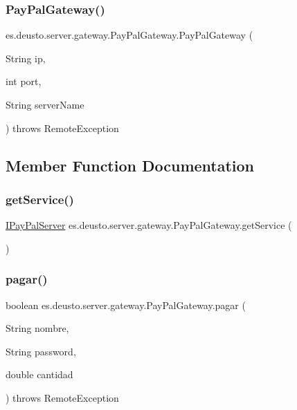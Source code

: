 \subsubsection{\texorpdfstring{PayPalGateway()}{PayPalGateway()}}
{\footnotesize\ttfamily es.\+deusto.\+server.\+gateway.\+Pay\+Pal\+Gateway.\+Pay\+Pal\+Gateway (\begin{DoxyParamCaption}\item[{String}]{ip,  }\item[{int}]{port,  }\item[{String}]{server\+Name }\end{DoxyParamCaption}) throws Remote\+Exception}



\subsection{Member Function Documentation}
\mbox{\label{classes_1_1deusto_1_1server_1_1gateway_1_1_pay_pal_gateway_ab6c1db972e19740c278d32abc7883fb6}} 
\subsubsection{\texorpdfstring{getService()}{getService()}}
{\footnotesize\ttfamily \mbox{\hyperlink{interfacees_1_1deusto_1_1paypal_1_1server_1_1_i_pay_pal_server}{I\+Pay\+Pal\+Server}} es.\+deusto.\+server.\+gateway.\+Pay\+Pal\+Gateway.\+get\+Service (\begin{DoxyParamCaption}{ }\end{DoxyParamCaption})}

\mbox{\label{classes_1_1deusto_1_1server_1_1gateway_1_1_pay_pal_gateway_a001d981b8bc619f54230b669475d41b6}} 
\subsubsection{\texorpdfstring{pagar()}{pagar()}}
{\footnotesize\ttfamily boolean es.\+deusto.\+server.\+gateway.\+Pay\+Pal\+Gateway.\+pagar (\begin{DoxyParamCaption}\item[{String}]{nombre,  }\item[{String}]{password,  }\item[{double}]{cantidad }\end{DoxyParamCaption}) throws Remote\+Exception}




